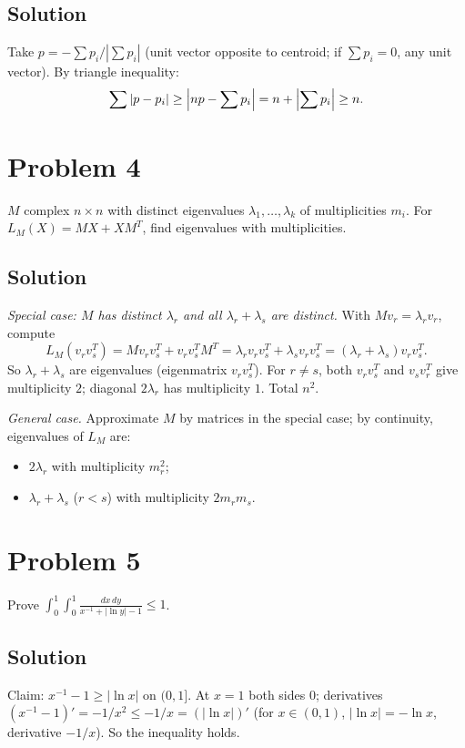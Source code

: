 \documentclass{article}
\begin{document}
\subsection*{Solution}
Take $p = -\sum p_i / |\sum p_i|$ (unit vector opposite to centroid; if $\sum p_i = 0$, any unit vector). By triangle inequality:
\[
\sum |p - p_i| \ge \Bigl| n p - \sum p_i \Bigr| = n + \Bigl|\sum p_i\Bigr| \ge n.
\]

\section*{Problem 4}
$M$ complex $n \times n$ with distinct eigenvalues $\lambda_1, \ldots, \lambda_k$ of multiplicities $m_i$. For $L_M(X) = MX + X M^T$, find eigenvalues with multiplicities.

\subsection*{Solution}
\emph{Special case: $M$ has distinct $\lambda_r$ and all $\lambda_r + \lambda_s$ are distinct.} With $M v_r = \lambda_r v_r$, compute
\[
L_M(v_r v_s^T) = M v_r v_s^T + v_r v_s^T M^T = \lambda_r v_r v_s^T + \lambda_s v_r v_s^T = (\lambda_r + \lambda_s) v_r v_s^T.
\]
So $\lambda_r + \lambda_s$ are eigenvalues (eigenmatrix $v_r v_s^T$). For $r \ne s$, both $v_r v_s^T$ and $v_s v_r^T$ give multiplicity $2$; diagonal $2 \lambda_r$ has multiplicity $1$. Total $n^2$.

\emph{General case.} Approximate $M$ by matrices in the special case; by continuity, eigenvalues of $L_M$ are:
\begin{itemize}
  \item $2 \lambda_r$ with multiplicity $m_r^2$;
  \item $\lambda_r + \lambda_s$ ($r < s$) with multiplicity $2 m_r m_s$.
\end{itemize}

\section*{Problem 5}
Prove $\displaystyle \int_0^1 \int_0^1 \frac{dx\, dy}{x^{-1} + |\ln y| - 1} \le 1$.

\subsection*{Solution}
Claim: $x^{-1} - 1 \ge |\ln x|$ on $(0, 1]$. At $x = 1$ both sides $0$; derivatives $(x^{-1} - 1)' = -1/x^2 \le -1/x = (|\ln x|)'$ (for $x \in (0, 1)$, $|\ln x| = -\ln x$, derivative $-1/x$). So the inequality holds.
\end{document}
